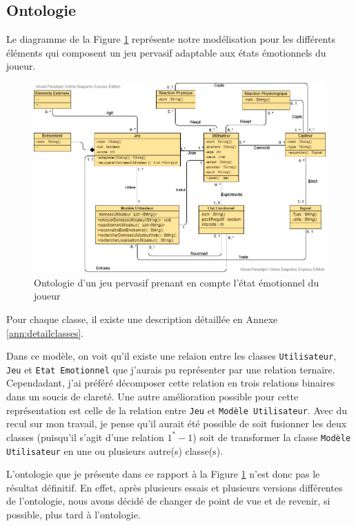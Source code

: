 \documentclass{article}
\begin{document}
	\subsection{Ontologie}\label{sec:ontologie}
		Le diagramme de la Figure \ref{fig:modele} représente notre modélisation pour les différents éléments qui composent un jeu pervasif adaptable aux états émotionnels du joueur.
		\begin{figure}[ht]
			\centering
			\includegraphics[scale=0.5]{../include/ontologie_stage_cnam-v2-5.png}
			\caption{Ontologie d'un jeu pervasif prenant en compte l'état émotionnel du joueur}
			\label{fig:modele}
		\end{figure}
		Pour chaque classe, il existe une description détaillée en Annexe \ref{ann:detailclasses}.\par
		Dans ce modèle, on voit qu'il existe une relaion entre les classes \texttt{Utilisateur}, \texttt{Jeu} et \texttt{Etat Emotionnel} que j'aurais pu représenter par une relation ternaire. 
		Cependadant, j'ai préféré décomposer cette relation en trois relations binaires dans un soucis de clareté. 
		Une autre amélioration possible pour cette représentation est celle de la relation entre \texttt{Jeu} et \texttt{Modèle Utilisateur}. 
		Avec du recul sur mon travail, je pense qu'il aurait été possible de soit fusionner les deux classes (puisqu'il s'agit d'une relation $1^* - 1$) soit de transformer la classe \texttt{Modèle Utilisateur} en une ou plusieurs autre(s) classe(s).\par
		L'ontologie que je présente dans ce rapport à la Figure \ref{fig:modele} n'est donc pas le résultat définitif.
		En effet, après plusieurs essais et plusieurs versions différentes de l'ontologie, nous avons décidé de changer de point de vue et de revenir, si possible, plus tard à l'ontologie.
\end{document}
